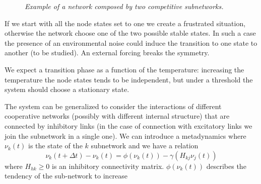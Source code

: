 \begin{figure}
\centering
{}
\caption{\emph{Example of a network composed by two competitive subnetworks.}}
\label{fig:comp}
\end{figure}
\par\noindent
If we start with all the node states set to one we create a frustrated situation, otherwise the network choose one
of the two possible stable states. In such a case the presence of an environmental noise could induce the transition
to one state to another (to be studied). An external forcing breaks the symmetry.\par\noindent
We expect a transition phase as a function of the temperature: increasing the temperature the node states tends 
to be independent, but under a threshold the system should choose a stationary state. 
\par\noindent
The system can be generalized to consider the interactions of different cooperative networks (possibly with different internal
structure) that are connected by inhibitory links (in the case of connection with excitatory links we join the subnetwork in a 
single one). We can introduce a metadynamics where $\nu_k(t)$ is the state of the $k$ subnetwork and
we have a relation
\begin{equation}
\nu_k(t+\Delta t)-\nu_k(t)=\phi(\nu_k(t))-\gamma\left (H_{kj}\nu_j(t)\right )
\label{metastoc}
\end{equation}
where $H_{hk}\ge 0$ is an inhibitory connectivity matrix. $\phi(\nu_k(t))$ describes the tendency of the sub-network to increase
